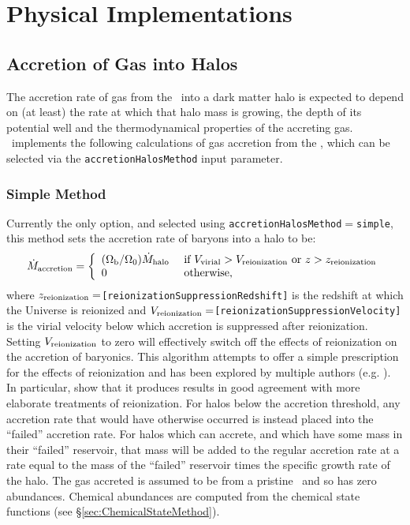 \chapter{Physical Implementations}

\section{Accretion of Gas into Halos}\label{sec:AccretionBaryonic}

The accretion rate of gas from the \IGM\ into a dark matter halo is expected to depend on (at least) the rate at which that halo mass is growing, the depth of its potential well and the thermodynamical properties of the accreting gas. \glc\ implements the following calculations of gas accretion from the \IGM, which can be selected via the {\tt accretionHalosMethod} input parameter.

\subsection{Simple Method}

Currently the only option, and selected using {\tt accretionHalosMethod}$=${\tt simple}, this method sets the accretion rate of baryons into a halo to be:
\begin{equation}
 \dot{M}_{\rm accretion} = \left\{ \begin{array}{ll} (\Omega_{\rm b}/\Omega_0) \dot{M}_{\rm halo} & \hbox{ if } V_{\rm virial} > V_{\rm reionization} \hbox{ or } z > z_{\rm reionization} \\ 0 & \hbox{ otherwise,}\end{array} \right.
\end{equation}
where $z_{\rm reionization}=${\tt [reionizationSuppressionRedshift]} is the redshift at which the Universe is reionized and $V_{\rm reionization}=${\tt [reionizationSuppressionVelocity]} is the virial velocity below which accretion is suppressed after reionization. Setting $V_{\rm reionization}$ to zero will effectively switch off the effects of reionization on the accretion of baryonics. This algorithm attempts to offer a simple prescription for the effects of reionization and has been explored by multiple authors (e.g. \citealt{benson_effects_2002}). In particular, \cite{font_modelingmilky_2010} show that it produces results in good agreement with more elaborate treatments of reionization. For halos below the accretion threshold, any accretion rate that would have otherwise occurred is instead placed into the ``failed'' accretion rate. For halos which can accrete, and which have some mass in their ``failed'' reservoir, that mass will be added to the regular accretion rate at a rate equal to the mass of the ``failed'' reservoir times the specific growth rate of the halo. The gas accreted is assumed to be from a pristine \IGM\ and so has zero abundances. Chemical abundances are computed from the chemical state functions (see \S\ref{sec:ChemicalStateMethod}).

